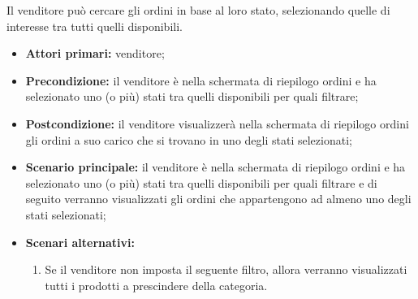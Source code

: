Il venditore può cercare gli ordini in base al loro stato, selezionando quelle di interesse tra tutti quelli disponibili.
\begin{itemize}
	\item \textbf{Attori primari:} venditore;
	\item \textbf{Precondizione:} il venditore è nella schermata di riepilogo ordini e ha selezionato uno (o più) stati tra quelli disponibili per quali filtrare;
	\item \textbf{Postcondizione:} il venditore visualizzerà nella schermata di riepilogo ordini gli ordini a suo carico che si trovano in uno degli stati selezionati;
	\item \textbf{Scenario principale:} il venditore è nella schermata di riepilogo ordini e ha selezionato uno (o più) stati tra quelli disponibili per quali filtrare e di seguito verranno visualizzati gli ordini che appartengono ad almeno uno degli stati selezionati;
	\item \textbf{Scenari alternativi:}
	\begin{enumerate}[label=\lett]
		\item Se il venditore non imposta il seguente filtro, allora verranno visualizzati tutti i prodotti a prescindere della categoria.
	\end{enumerate}
\end{itemize}

